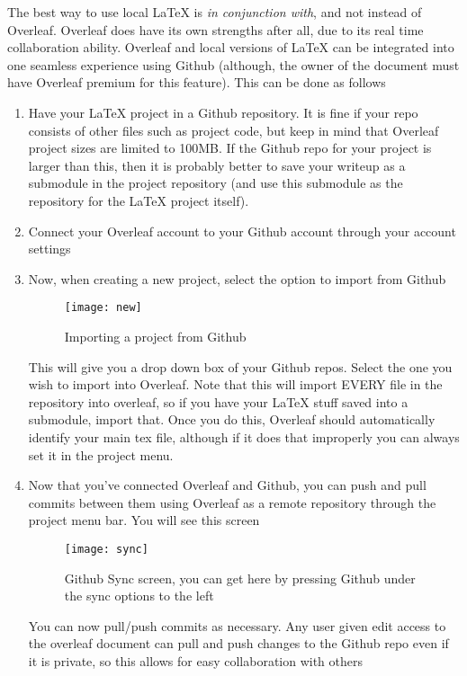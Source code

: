 \graphicspath{{Parts/3_Integrations/graphics/}}
The best way to use local \LaTeX{} is \emph{in conjunction with}, and not instead of Overleaf. Overleaf does have its own strengths after all, due to its real time collaboration ability. Overleaf and local versions of \LaTeX{} can be integrated into one seamless experience using Github (although, the owner of the document must have Overleaf premium for this feature). This can be done as follows
\begin{enumerate}
    \item Have your \LaTeX{} project in a Github repository. It is fine if your repo consists of other files such as project code, but keep in mind that Overleaf project sizes are limited to 100MB. If the Github repo for your project is larger than this, then it is probably better to save your writeup as a submodule in the project repository (and use this submodule as the repository for the \LaTeX{} project itself).
    \item Connect your Overleaf account to your Github account through your account settings
    \item Now, when creating a new project, select the option to import from Github
    \begin{figure}[ht!]
        \centering
        \texttt{[image: new]}
        \caption{Importing a project from Github}
    \end{figure}
    This will give you a drop down box of your Github repos. Select the one you wish to import into Overleaf. Note that this will import EVERY file in the repository into overleaf, so if you have your \LaTeX{} stuff saved into a submodule, import that. Once you do this, Overleaf should automatically identify your main tex file, although if it does that improperly you can always set it in the project menu.

    \item 
    Now that you've connected Overleaf and Github, you can push and pull commits between them using Overleaf as a remote repository through the project menu bar. You will see this screen
    \newpage
    \begin{figure}[ht!]
        \centering
        \texttt{[image: sync]}
        \caption{Github Sync screen, you can get here by pressing Github under the sync options to the left}
    \end{figure}
    You can now pull/push commits as necessary. Any user given edit access to the overleaf document can pull and push changes to the Github repo even if it is private, so this allows for easy collaboration with others


\end{enumerate}
